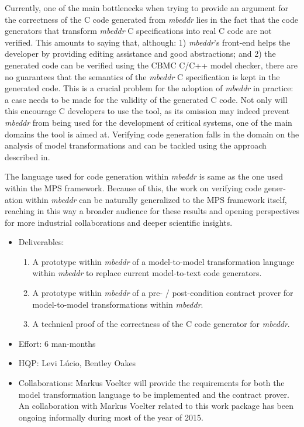Currently, one of the main bottlenecks when trying to provide an argument for
the correctness of the C code generated from \emph{mbeddr} lies in the fact that the
code generators that transform \emph{mbeddr} C specifications into real C code are not
verified. This amounts to saying that, although: 1) \emph{mbeddr}’s front-end helps the
developer by providing editing assistance and good abstractions; and 2) the
generated code can be verified using the CBMC\cite{KroeningT14} C/C++ model
checker, there are no guarantees that the semantics of the \emph{mbeddr} C specification is kept in the
generated code. This is a crucial problem for the adoption of \emph{mbeddr} in
practice: a case needs to be made for the validity of the generated C code. Not
only will this encourage C developers to use the tool, as its omission may
indeed prevent \emph{mbeddr} from being used for the development of critical systems,
one of the main domains the tool is aimed at. Verifying code generation falls in
the domain on the analysis of model transformations and can be tackled using the
approach described in\cite{Lucio2014,Oakes2015}.

The language used for code generation within \emph{mbeddr} is same as the one used
within the MPS framework. Because of this, the work on verifying code gener-
ation within \emph{mbeddr} can be naturally generalized to the MPS framework itself,
reaching in this way a broader audience for these results and opening
perspectives for more industrial collaborations and deeper scientific
insights.

\begin{itemize}
  \item Deliverables:
  \begin{enumerate}
    \item A prototype within \emph{mbeddr} of a model-to-model transformation language
within \emph{mbeddr} to replace current model-to-text code generators.
	\item A prototype within \emph{mbeddr} of a pre- / post-condition contract prover for
model-to-model transformations within \emph{mbeddr}.
	\item A technical proof of the correctness of the C code generator for \emph{mbeddr}.
  \end{enumerate}
  \item Effort: 6 man-months
  \item HQP: Levi L\'ucio, Bentley Oakes
  \item Collaborations: Markus Voelter will provide the requirements for both
  the model transformation language to be implemented and the contract prover.
  An collaboration with Markus Voelter related to this work package has been ongoing
informally during most of the year of 2015.
\end{itemize}